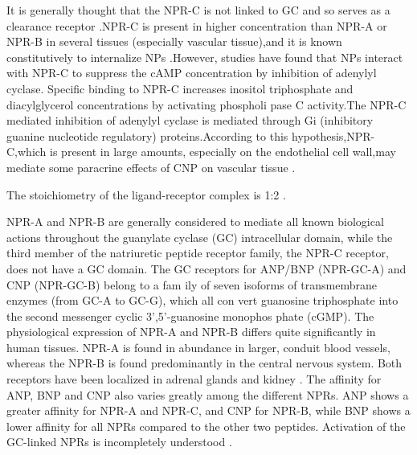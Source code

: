 \documentclass[14pt,a4paper,onecolumn]{extarticle}
\begin{document}
It is generally thought that the NPR-C is not linked to GC and so serves as a clearance receptor \citep{28} \citep{77} \citep{bib33}.NPR-C is present in higher concentration than NPR-A or NPR-B in several tissues (especially vascular tissue),and it is known constitutively to internalize NPs \citep{172}.However, studies have found that NPs interact with NPR-C to suppress the cAMP concentration by inhibition of adenylyl cyclase. Specific binding to NPR-C increases inositol triphosphate and diacylglycerol concentrations by activating phospholi pase C activity.The NPR-C mediated inhibition of adenylyl cyclase is mediated through Gi (inhibitory guanine nucleotide regulatory) proteins.According to this hypothesis,NPR-C,which is present in large amounts, especially on the endothelial cell wall,may mediate some paracrine effects of CNP on vascular tissue \citep{168} \citep{190}. %


The stoichiometry of the ligand-receptor complex is 1:2 \citep{177}. %

NPR-A and NPR-B are generally considered to mediate all known biological actions throughout the guanylate cyclase (GC) intracellular domain, while the third member of the natriuretic peptide receptor family, the NPR-C receptor, does not have a GC domain.  The GC receptors for ANP/BNP (NPR-GC-A) and CNP (NPR-GC-B) belong to a fam ily of seven isoforms of transmembrane enzymes (from GC-A to GC-G), which all con vert guanosine triphosphate into the second messenger cyclic 3’,5’-guanosine monophos phate (cGMP).  The physiological expression of NPR-A and NPR-B differs quite significantly in human tissues. NPR-A is found in abundance in larger, conduit blood vessels, whereas the NPR-B is found predominantly in the central nervous system. Both receptors have been localized in adrenal glands and kidney \citep{168}.  The affinity for ANP, BNP and CNP also varies greatly among the different NPRs.  ANP shows a greater affinity for NPR-A and NPR-C, and CNP for NPR-B, while BNP shows a lower affinity for all NPRs compared to the other two peptides.  Activation of the GC-linked NPRs is incompletely understood \citep{172}. %
\end{document}
